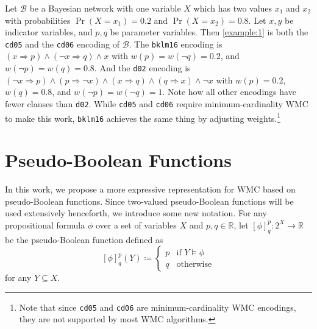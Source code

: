 \begin{example} \label{example:2}
  Let $\mathcal{B}$ be a Bayesian network with one variable $X$ which has two
  values $x_1$ and $x_2$ with probabilities $\Pr(X = x_1) = 0.2$ and $\Pr(X =
  x_2) = 0.8$. Let $x, y$ be indicator variables, and $p, q$ be parameter
  variables. Then \cref{example:1} is both the \texttt{cd05} and the
  \texttt{cd06} encoding of $\mathcal{B}$. The \texttt{bklm16} encoding is $(x
  \Rightarrow p) \land (\neg x \Rightarrow q) \land x$ with $w(p) = w(\neg q) =
  0.2$, and $w(\neg p) = w(q) = 0.8$. And the \texttt{d02} encoding is $(\neg x
  \Rightarrow p) \land (p \Rightarrow \neg x) \land (x \Rightarrow q) \land (q
  \Rightarrow x) \land \neg x$ with $w(p) = 0.2$, $w(q) = 0.8$, and $w(\neg p) =
  w(\neg q) = 1$. Note how all other encodings have fewer clauses than
  \texttt{d02}. While \texttt{cd05} and \texttt{cd06} require
  minimum-cardinality WMC to make this work, \texttt{bklm16} achieves the same
  thing by adjusting weights.\footnote{Note that since \texttt{cd05} and
    \texttt{cd06} are minimum-cardinality WMC encodings, they are not supported
    by most WMC algorithms.}
\end{example}


\section{Pseudo-Boolean Functions}

In this work, we propose a more expressive representation for WMC based on
pseudo-Boolean functions. Since two-valued pseudo-Boolean functions will be used
extensively henceforth, we introduce some new notation. For any propositional
formula $\phi$ over a set of variables $X$ and $p, q \in \mathbb{R}$, let
${[\phi]}^p_q\colon 2^X \to \mathbb{R}$ be the pseudo-Boolean function defined
as
\[
  {[\phi]}^p_q(Y) \coloneqq
  \begin{cases}
    p & \text{if } Y \models \phi \\
    q & \text{otherwise}
  \end{cases}
\]
for any $Y \subseteq X$.

